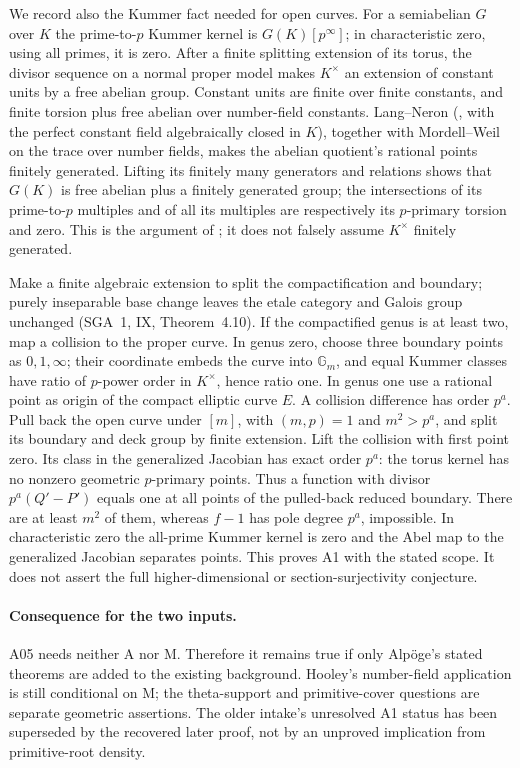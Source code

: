 \documentclass[11pt,a4paper]{article}
\begin{document}
We record also the Kummer fact needed for open curves. For a
semiabelian $G$ over $K$ the prime-to-$p$ Kummer kernel is
$G(K)[p^\infty]$; in characteristic zero, using all primes,
it is zero. After a finite splitting extension of its torus,
the divisor sequence on a normal proper model makes
$K^\times$ an extension of constant units by a free abelian
group. Constant units are finite over finite constants, and
finite torsion plus free abelian over number-field constants.
Lang--Neron (\cite[Theorem~2.1]{Conrad}, with the perfect constant
field algebraically closed in $K$), together with Mordell--Weil on the trace over
number fields, makes the abelian quotient's rational points
finitely generated. Lifting its finitely many generators and
relations shows that $G(K)$ is free abelian plus a finitely
generated group; the intersections of its prime-to-$p$
multiples and of all its multiples are respectively its
$p$-primary torsion and zero. This is the argument of
\cite[A.30]{A1run}; it does not falsely assume $K^\times$
finitely generated.

Make a finite algebraic extension to split the compactification
and boundary; purely inseparable base change leaves the etale
category and Galois group unchanged (SGA~1, IX,
Theorem~4.10). If the compactified genus is at least two,
map a collision to the proper curve. In genus zero, choose
three boundary points as $0,1,\infty$; their coordinate embeds
the curve into $\mathbb G_m$, and equal Kummer classes have
ratio of $p$-power order in $K^\times$, hence ratio one.
In genus one use a rational point as origin of the compact
elliptic curve $E$. A collision difference has order $p^a$.
Pull back the open curve under $[m]$, with $(m,p)=1$ and
$m^2>p^a$, and split its boundary and deck group by finite
extension. Lift the collision with first point zero. Its class
in the generalized Jacobian has exact order $p^a$: the torus
kernel has no nonzero geometric $p$-primary points. Thus a
function with divisor $p^a(Q'-P')$ equals one at all points
of the pulled-back reduced boundary. There are at least
$m^2$ of them, whereas $f-1$ has pole degree $p^a$, impossible.
In characteristic zero the all-prime Kummer kernel is zero
and the Abel map to the generalized Jacobian separates points.
This proves A1 with the stated scope. It does not assert the
full higher-dimensional or section-surjectivity conjecture.

\paragraph{Consequence for the two inputs.}
A05 needs neither A nor M. Therefore it remains true if only
Alp\"oge's stated theorems are added to the existing background.
Hooley's number-field application is still conditional on M;
the theta-support and primitive-cover questions are separate
geometric assertions. The older intake's unresolved A1 status
has been superseded by the recovered later proof, not by an
unproved implication from primitive-root density.
\end{document}

